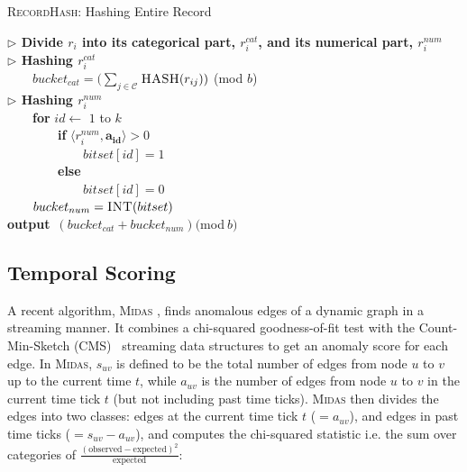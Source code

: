 \documentclass[sigconf]{acmart}
\renewcommand{\vec}[1]{\mathbf{#1}}
\begin{document}
\begin{algorithm}
	\caption{\textsc{RecordHash}: Hashing Entire Record  \label{alg:recordhash}}
	{\bf $\triangleright$ Divide $r_{i}$ into its categorical part, $r_{i}^{cat}$, and its numerical part, $r_{i}^{num}$} \\
	{\bf $\triangleright$ Hashing $r_{i}^{cat}$} \\
	\ \ \ \ $bucket_{cat} = (\sum_{j \in \mathcal{C} }${$\Call{HASH}{r_{ij}})$} (mod $b$)  \\
	{\bf $\triangleright$ Hashing $r_{i}^{num}$} \\
	\ \ \ \ \textbf{for} $id \gets$ $1$ to $k$  \\
	\ \ \ \ \ \ \ \	\textbf{if} $\langle{r_{i}^{num} , \vec{a_{id}}}\rangle > 0$  \\
	\ \ \ \ \ \ \ \ \ \ \ \ $bitset[id] = 1$ \\
	\ \ \ \ \ \ \ \ \textbf{else}  \\
	\ \ \ \ \ \ \ \ \ \ \ \ $bitset[id] = 0$ \\
	\ \ \ \ $bucket_{num} = \Call{INT}{bitset}$  \\

    {\bf output}\ $(bucket_{cat}+bucket_{num})($mod$ \ b)$
\end{algorithm}



\subsection{Temporal Scoring}
\label{sec:scoring}

A recent algorithm, \textsc{Midas} \cite{bhatia2020midas}, finds anomalous edges of a dynamic graph in a streaming manner. It combines a chi-squared goodness-of-fit test with the Count-Min-Sketch (CMS)~\cite{cormode2005improved} streaming data structures to get an anomaly score for each edge. In \textsc{Midas}, $s_{uv}$ is defined to be the total number of edges from node $u$ to $v$ up to the current time $t$, while $a_{uv}$ is the number of edges from node $u$ to $v$ in the current time tick $t$ (but not including past time ticks). \textsc{Midas} then divides the edges into two classes: edges at the current time tick $t$ ($=a_{uv}$), and edges in past time ticks ($=s_{uv} - a_{uv}$), and computes the chi-squared statistic i.e. the sum over categories of $\frac{(\text{observed} - \text{expected})^2}{\text{expected}}$:
\end{document}
